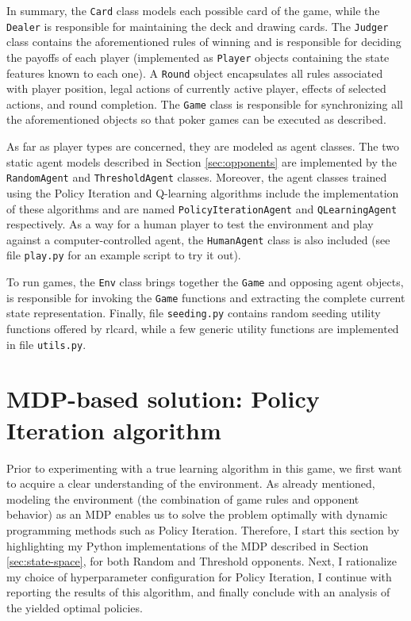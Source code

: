 In summary, the \Verb|Card| class models each possible card of the game, while the \Verb|Dealer| is responsible for maintaining the deck and drawing cards. The \Verb|Judger| class contains the aforementioned rules of winning and is responsible for deciding the payoffs of each player (implemented as \Verb|Player| objects containing the state features known to each one). A \Verb|Round| object encapsulates all rules associated with player position, legal actions of currently active player, effects of selected actions, and round completion. The \Verb|Game| class is responsible for synchronizing all the aforementioned objects so that poker games can be executed as described.

As far as player types are concerned, they are modeled as agent classes. The two static agent models described in Section \ref{sec:opponents} are implemented by the \Verb|RandomAgent| and \Verb|ThresholdAgent| classes. Moreover, the agent classes trained using the Policy Iteration and Q-learning algorithms include the implementation of these algorithms and are named \Verb|PolicyIterationAgent| and \Verb|QLearningAgent| respectively. As a way for a human player to test the environment and play against a computer-controlled agent, the \Verb|HumanAgent| class is also included (see file \Verb|play.py| for an example script to try it out).

To run games, the \Verb|Env| class brings together the \Verb|Game| and opposing agent objects, is responsible for invoking the \Verb|Game| functions and extracting the complete current state representation. Finally, file \Verb|seeding.py| contains random seeding utility functions offered by rlcard, while a few generic utility functions are implemented in file \Verb|utils.py|.

\section{MDP-based solution: Policy Iteration algorithm}

Prior to experimenting with a true learning algorithm in this game, we first want to acquire a clear understanding of the environment. As already mentioned, modeling the environment (the combination of game rules and opponent behavior) as an MDP enables us to solve the problem optimally with dynamic programming methods such as Policy Iteration. Therefore, I start this section by highlighting my Python implementations of the MDP described in Section \ref{sec:state-space}, for both Random and Threshold opponents. Next, I rationalize my choice of hyperparameter configuration for Policy Iteration, I continue with reporting the results of this algorithm, and finally conclude with an analysis of the yielded optimal policies.

